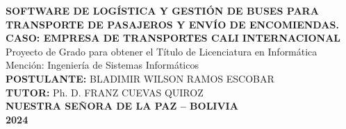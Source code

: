 \begin{titlepage}
\begin{center}
		{\textbf{SOFTWARE DE LOGÍSTICA Y GESTIÓN DE BUSES PARA TRANSPORTE DE PASAJEROS Y ENVÍO DE ENCOMIENDAS.\\
		CASO: EMPRESA DE TRANSPORTES CALI INTERNACIONAL}}\\
		{Proyecto de Grado para obtener el Título de Licenciatura en Informática}\\
		Mención: Ingeniería de Sistemas Informáticos\\
		
		\textbf{POSTULANTE:} BLADIMIR WILSON RAMOS ESCOBAR\\
		\textbf{TUTOR:} Ph. D. FRANZ CUEVAS QUIROZ\\
		\textbf{NUESTRA SEÑORA DE LA PAZ – BOLIVIA}\\
		\textbf{2024}\\
	\end{center}
\end{titlepage}
